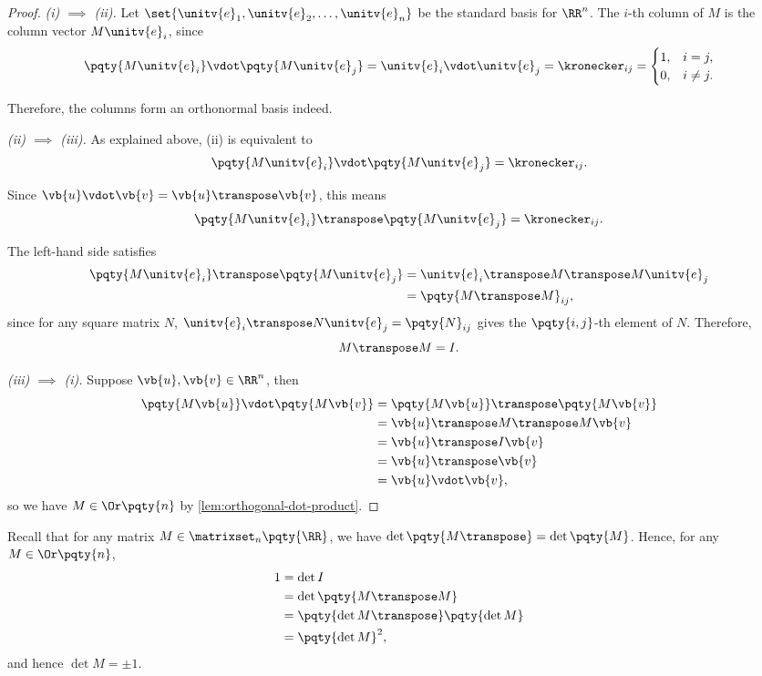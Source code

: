 \begin{proof}
    \emph{(i) \(\implies\) (ii).} Let \(\set{\unitv{e}_1, \unitv{e}_2, \ldots, \unitv{e}_n}\) be the standard basis for \(\RR^n\). The \(i\)-th column of \(M\) is the column vector \(M \unitv{e}_i\), since
    \[
        \pqty{M \unitv{e}_i} \vdot \pqty{M \unitv{e}_j} = \unitv{e}_i \vdot \unitv{e}_j = \kronecker_{ij} = \begin{cases}
            1, & i = j, \\
            0, & i \neq j.
        \end{cases}
    \]

    Therefore, the columns form an orthonormal basis indeed.

    \emph{(ii) \(\implies\) (iii).} As explained above, (ii) is equivalent to
    \[
        \pqty{M \unitv{e}_i} \vdot \pqty{M \unitv{e}_j }= \kronecker_{ij}.
    \]

    Since \(\vb{u} \vdot \vb{v} = \vb{u} \transpose \vb{v}\), this means
    \[
        \pqty{M \unitv{e}_i}\transpose \pqty{M \unitv{e}_j} = \kronecker_{ij}.
    \]
    
    The left-hand side satisfies
    \begin{align*}
        \pqty{M \unitv{e}_i}\transpose \pqty{M \unitv{e}_j} &= \unitv{e}_i\transpose M\transpose M \unitv{e}_j \\
        &= \pqty{M\transpose M}_{ij},
    \end{align*}
    since for any square matrix \(N\), \(\unitv{e}_i \transpose N \unitv{e}_j = \pqty{N}_{ij}\) gives the \(\pqty{i, j}\)-th element of \(N\). Therefore,
    \[
        M\transpose M = I.
    \]

    \emph{(iii) \(\implies\) (i).} Suppose \(\vb{u}, \vb{v} \in \RR^n\), then
    \begin{align*}
        \pqty{M\vb{u}} \vdot \pqty{M\vb{v}} &= \pqty{M\vb{u}}\transpose \pqty{M\vb{v}} \\
        &= \vb{u}\transpose M\transpose M \vb{v} \\
        &= \vb{u}\transpose I \vb{v} \\
        &= \vb{u}\transpose \vb{v} \\
        &= \vb{u} \vdot \vb{v},
    \end{align*}
    so we have \(M \in \Or\pqty{n}\) by \autoref{lem:orthogonal-dot-product}.
\end{proof}

Recall that for any matrix \(M \in \matrixset_{n} \pqty{\RR}\), we have \(\det \pqty{M\transpose} = \det \pqty{M}\). Hence, for any \(M \in \Or\pqty{n}\),
\begin{align*}
    1 &= \det I \\
    &= \det \pqty{M\transpose M} \\
    &= \pqty{\det M\transpose} \pqty{\det M} \\
    &= \pqty{\det M}^2,
\end{align*}
and hence \(\det M = \pm 1\).

